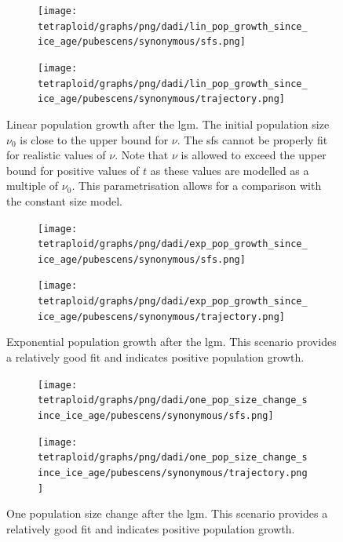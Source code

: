 \documentclass[hidelinks,11pt]{article}
\begin{document}
    \begin{figure}[H]
        \centering
        \begin{subfigure}[b]{0.465\textwidth}
            \texttt{[image: tetraploid/graphs/png/dadi/lin\_pop\_growth\_since\_ice\_age/pubescens/synonymous/sfs.png]}
        \end{subfigure}
        \hfill
        \begin{subfigure}[b]{0.525\textwidth}
            \texttt{[image: tetraploid/graphs/png/dadi/lin\_pop\_growth\_since\_ice\_age/pubescens/synonymous/trajectory.png]}
        \end{subfigure}
        \caption{Linear population growth after the \acrshort{lgm}. The initial population size $\nu_0$ is close to the upper bound for $\nu$. The \acrshort{sfs} cannot be properly fit for realistic values of $\nu$. Note that $\nu$ is allowed to exceed the upper bound for positive values of $t$ as these values are modelled as a multiple of $\nu_0$. This parametrisation allows for a comparison with the constant size model.}
        \label{fig:lin_pop_growth_since_ice_age_pubescens}
    \end{figure}

    \begin{figure}[H]
        \centering
        \begin{subfigure}[b]{0.465\textwidth}
            \texttt{[image: tetraploid/graphs/png/dadi/exp\_pop\_growth\_since\_ice\_age/pubescens/synonymous/sfs.png]}
        \end{subfigure}
        \hfill
        \begin{subfigure}[b]{0.525\textwidth}
            \texttt{[image: tetraploid/graphs/png/dadi/exp\_pop\_growth\_since\_ice\_age/pubescens/synonymous/trajectory.png]}
        \end{subfigure}
        \caption{Exponential population growth after the \acrshort{lgm}. This scenario provides a relatively good fit and indicates positive population growth.}
        \label{fig:exp_pop_growth_since_ice_age_pubescens}
    \end{figure}

    \begin{figure}[H]
        \centering
        \begin{subfigure}[b]{0.465\textwidth}
            \texttt{[image: tetraploid/graphs/png/dadi/one\_pop\_size\_change\_since\_ice\_age/pubescens/synonymous/sfs.png]}
        \end{subfigure}
        \hfill
        \begin{subfigure}[b]{0.525\textwidth}
            \texttt{[image: tetraploid/graphs/png/dadi/one\_pop\_size\_change\_since\_ice\_age/pubescens/synonymous/trajectory.png]}
        \end{subfigure}
        \caption{One population size change after the \acrshort{lgm}. This scenario provides a relatively good fit and indicates positive population growth.}
        \label{fig:one_pop_size_change_since_ice_age_pubescens}
    \end{figure}
\end{document}
